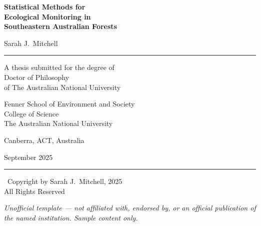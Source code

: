 \documentclass[12pt,a4paper,oneside]{book}
\begin{document}
\frontmatter

\begin{titlepage}
\pagecolor{pagecream}
\thispagestyle{empty}
\begin{center}

\vspace*{36pt}

{\fontsize{24}{28}\selectfont\bfseries Statistical Methods for\\[6pt]
Ecological Monitoring in\\[6pt] Southeastern Australian Forests\par}

\vspace{28pt}

{\Large Sarah J.\ Mitchell}

\vspace{20pt}

\textcolor{anucrimson}{\rule{0.42\textwidth}{1.2pt}}

\vspace{20pt}

{\large A thesis submitted for the degree of\\
Doctor of Philosophy\\
of The Australian National University\par}

\vspace{28pt}

Fenner School of Environment and Society\\
College of Science\\
The Australian National University

\vspace{12pt}

Canberra, ACT, Australia

\vspace{8pt}

September 2025

\vspace{30pt}

\textcolor{anucrimson}{\rule{0.32\textwidth}{0.5pt}}

\vspace{18pt}

{\small\textcopyright\ Copyright by Sarah J.\ Mitchell, 2025\\
All Rights Reserved\par}

\vfill
{\footnotesize\itshape Unofficial template --- not affiliated with, endorsed by, or an official publication of the named institution. Sample content only.}
\end{center}
\end{titlepage}
\pagecolor{white}
\end{document}
